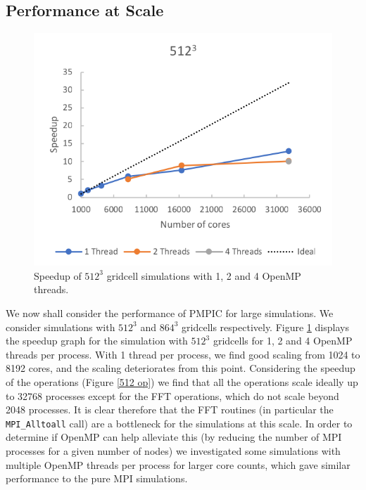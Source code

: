 \documentclass{article}
\begin{document}
\subsection{Performance at Scale}

\begin{figure}
  \begin{center}
    \includegraphics{pmpic_images/512.png}
  \end{center}
  \caption{Speedup of $512^3$ gridcell simulations with 1, 2 and 4 OpenMP threads.}
  \label{512 scaling}
\end{figure}
We now shall consider the performance of PMPIC for large simulations. We consider simulations with $512^3$ and $864^3$ gridcells respectively. Figure \ref{512 scaling} displays the speedup graph for the simulation with $512^3$ gridcells for 1, 2 and 4 OpenMP threads per process. With 1 thread per process, we find good scaling from 1024 to 8192 cores, and the scaling deteriorates from this point. Considering the speedup of the operations (Figure \ref{512 op}) we find that all the operations scale ideally up to 32768 processes except for the FFT operations, which do not scale beyond 2048 processes. It is clear therefore that the FFT routines (in particular the \verb|MPI_Alltoall| call) are a bottleneck for the simulations at this scale. In order to determine if OpenMP can help alleviate this (by reducing the number of MPI processes for a given number of nodes) we investigated some simulations with multiple OpenMP threads per process for larger core counts, which gave similar performance to the pure MPI simulations.
\end{document}
